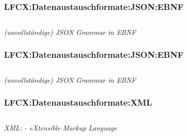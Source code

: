 \begin{frame}[fragile]  
  \frametitle{LFCX:Datenaustauschformate:JSON:EBNF}
  \begin{center}
  \begin{minipage}{0.9\textwidth}
    \inputminted[fontsize=\footnotesize,linenos]{ebnf}{\snpLf/cx-dff-grammar-json.ebnf}   
  \end{minipage}
  \end{center}

  \vspace{0.6cm}
  \begin{flushright}
    \begin{tiny}
      \textrm{\textit{(unvollständige) JSON Grammar in EBNF}}
    \end{tiny}
  \end{flushright}
\end{frame}

\begin{frame}[fragile]  
  \frametitle{LFCX:Datenaustauschformate:JSON:EBNF}
  \begin{center}
  \begin{minipage}{0.9\textwidth}
    \inputminted[fontsize=\footnotesize,linenos]{ebnf}{\snpLf/cx-dff-grammar-deduction.ebnf}   
  \end{minipage}
  \end{center}

  \vspace{0.6cm}
  \begin{flushright}
    \begin{tiny}
      \textrm{\textit{(unvollständige) JSON Grammar in EBNF}}
    \end{tiny}
  \end{flushright}
\end{frame}

\begin{frame}[fragile]  
  \frametitle{LFCX:Datenaustauschformate:XML}
  \begin{center}
  \begin{minipage}{0.6\textwidth}
    \inputminted[fontsize=\footnotesize,linenos]{xml}{\snpLf/cx-dff-measure.xml}   
  \end{minipage}
  \end{center}
  
  \begin{flushright}
    \begin{tiny}
      \textrm{\textit{XML: - eXtensible Markup Language}}
    \end{tiny}
  \end{flushright}
\end{frame}

